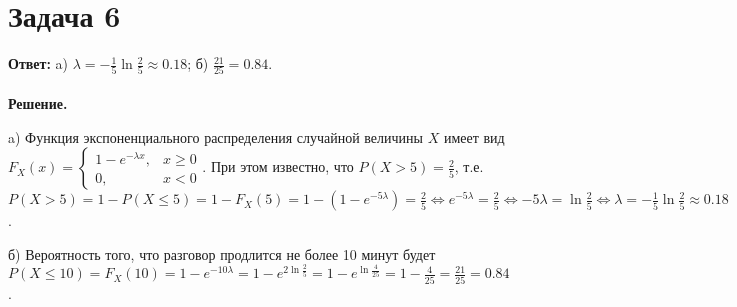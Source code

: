 \documentclass{article}
\begin{document}
\section*{Задача 6}
{\bf Ответ: } a) $\lambda=-\frac{1}{5}\ln \frac{2}{5}\approx 0.18$; б) $\frac{21}{25}=0.84$.
\\
\\
{\bf Решение.}
\par
a) Функция экспоненциального распределения случайной величины $X$ имеет вид $F_X(x)=
\begin{cases}
    1-e^{-\lambda x}, &x \geq 0\\
    0,                &x < 0
\end{cases}$. При этом известно, что $P(X > 5)=\frac{2}{5}$, т.е. $P(X > 5)=1 - P(X \leq 5)=1-F_X(5)=1-(1-e^{-5\lambda})=\frac{2}{5}\Leftrightarrow e^{-5\lambda}=\frac{2}{5}\Leftrightarrow -5\lambda = \ln\frac{2}{5}\Leftrightarrow \lambda=-\frac{1}{5}\ln\frac{2}{5}\approx 0.18$.
\par
б) Вероятность того, что разговор продлится не более 10 минут будет $P(X \leq 10) = F_X(10)=1-e^{-10\lambda}=1-e^{2\ln\frac{2}{5}}=1-e^{\ln\frac{4}{25}}=1-\frac{4}{25}=\frac{21}{25}=0.84$.
\end{document}
